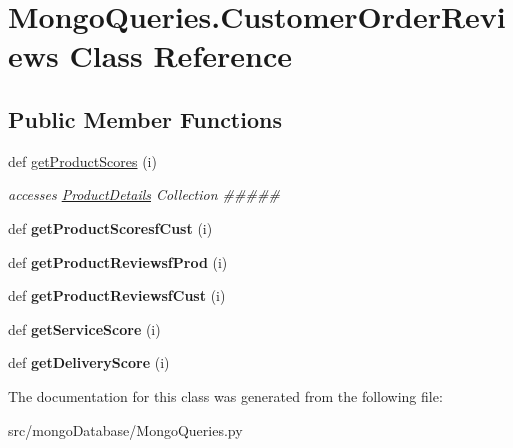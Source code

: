 \hypertarget{class_mongo_queries_1_1_customer_order_reviews}{}\section{Mongo\+Queries.\+Customer\+Order\+Reviews Class Reference}
\label{class_mongo_queries_1_1_customer_order_reviews}
\subsection*{Public Member Functions}
\begin{DoxyCompactItemize}
\item 
\hypertarget{class_mongo_queries_1_1_customer_order_reviews_a4a6fc6cd2e4ff0421c0c67ac5e57e167}{}\label{class_mongo_queries_1_1_customer_order_reviews_a4a6fc6cd2e4ff0421c0c67ac5e57e167} 
def \hyperlink{class_mongo_queries_1_1_customer_order_reviews_a4a6fc6cd2e4ff0421c0c67ac5e57e167}{get\+Product\+Scores} (i)
\begin{DoxyCompactList}\small\item\em accesses \hyperlink{class_mongo_queries_1_1_product_details}{Product\+Details} Collection \#\#\#\#\# \end{DoxyCompactList}\item 
\hypertarget{class_mongo_queries_1_1_customer_order_reviews_ac347dd548f4ba963a6b8c4edc078ef2f}{}\label{class_mongo_queries_1_1_customer_order_reviews_ac347dd548f4ba963a6b8c4edc078ef2f} 
def {\bfseries get\+Product\+Scoresf\+Cust} (i)
\item 
\hypertarget{class_mongo_queries_1_1_customer_order_reviews_a099e617ee45f23d1927c2eeaaf459745}{}\label{class_mongo_queries_1_1_customer_order_reviews_a099e617ee45f23d1927c2eeaaf459745} 
def {\bfseries get\+Product\+Reviewsf\+Prod} (i)
\item 
\hypertarget{class_mongo_queries_1_1_customer_order_reviews_af30eb76b9151f6a8985822e04d888a76}{}\label{class_mongo_queries_1_1_customer_order_reviews_af30eb76b9151f6a8985822e04d888a76} 
def {\bfseries get\+Product\+Reviewsf\+Cust} (i)
\item 
\hypertarget{class_mongo_queries_1_1_customer_order_reviews_ab679e16849111b5fe3ecccc9aeadab02}{}\label{class_mongo_queries_1_1_customer_order_reviews_ab679e16849111b5fe3ecccc9aeadab02} 
def {\bfseries get\+Service\+Score} (i)
\item 
\hypertarget{class_mongo_queries_1_1_customer_order_reviews_ac6c9d968c69ffa58c6594f56a35024d7}{}\label{class_mongo_queries_1_1_customer_order_reviews_ac6c9d968c69ffa58c6594f56a35024d7} 
def {\bfseries get\+Delivery\+Score} (i)
\end{DoxyCompactItemize}


The documentation for this class was generated from the following file\+:\begin{DoxyCompactItemize}
\item 
src/mongo\+Database/Mongo\+Queries.\+py\end{DoxyCompactItemize}
